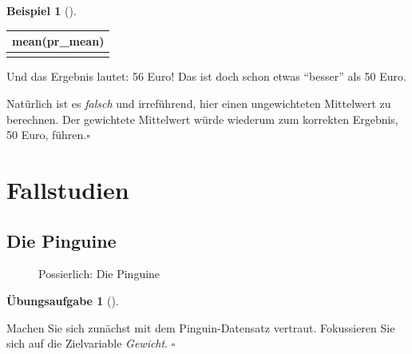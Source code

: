 \documentclass[
  a4paper,
  DIV=11]{scrreprt}
\theoremstyle{definition}
\newtheorem{exercise}{Übungsaufgabe}[chapter]
\theoremstyle{definition}
\newtheorem{example}{Beispiel}[chapter]
\theoremstyle{definition}
\theoremstyle{remark}
\begin{document}
\begin{example}[]
\begin{longtable}[]{@{}r@{}}
\toprule\noalign{}
mean(pr\_mean) \\
\midrule\noalign{}
\endhead
\bottomrule\noalign{}
\endlastfoot
56 \\
\end{longtable}

Und das Ergebnis lautet: 56 Euro! Das ist doch schon etwas ``besser''
als 50 Euro.

Natürlich ist es \emph{falsch} und irreführend, hier einen ungewichteten
Mittelwert zu berechnen. Der gewichtete Mittelwert würde wiederum zum
korrekten Ergebnis, 50 Euro, führen.\(\square\)

\end{example}

\section{Fallstudien}\label{fallstudien}

\subsection{Die Pinguine}\label{die-pinguine}

\begin{figure}


\caption{\label{fig-penguins}Possierlich: Die Pinguine}

\end{figure}%

\begin{exercise}[]\protect\hypertarget{exr-peng-start}{}\label{exr-peng-start}

Machen Sie sich zunächst mit dem Pinguin-Datensatz vertraut. Fokussieren
Sie sich auf die Zielvariable \emph{Gewicht}. \(\square\)

\end{exercise}
\end{document}
